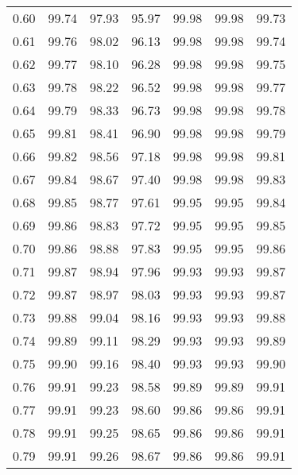 \begin{tabular}{|c|c|c|c|c|c|c|}
      0.60 &     99.74 &     97.93 &      95.97 &   99.98 &      99.98 &         99.73 \\
      0.61 &     99.76 &     98.02 &      96.13 &   99.98 &      99.98 &         99.74 \\
      0.62 &     99.77 &     98.10 &      96.28 &   99.98 &      99.98 &         99.75 \\
      0.63 &     99.78 &     98.22 &      96.52 &   99.98 &      99.98 &         99.77 \\
      0.64 &     99.79 &     98.33 &      96.73 &   99.98 &      99.98 &         99.78 \\
      0.65 &     99.81 &     98.41 &      96.90 &   99.98 &      99.98 &         99.79 \\
      0.66 &     99.82 &     98.56 &      97.18 &   99.98 &      99.98 &         99.81 \\
      0.67 &     99.84 &     98.67 &      97.40 &   99.98 &      99.98 &         99.83 \\
      0.68 &     99.85 &     98.77 &      97.61 &   99.95 &      99.95 &         99.84 \\
      0.69 &     99.86 &     98.83 &      97.72 &   99.95 &      99.95 &         99.85 \\
      0.70 &     99.86 &     98.88 &      97.83 &   99.95 &      99.95 &         99.86 \\
      0.71 &     99.87 &     98.94 &      97.96 &   99.93 &      99.93 &         99.87 \\
      0.72 &     99.87 &     98.97 &      98.03 &   99.93 &      99.93 &         99.87 \\
      0.73 &     99.88 &     99.04 &      98.16 &   99.93 &      99.93 &         99.88 \\
      0.74 &     99.89 &     99.11 &      98.29 &   99.93 &      99.93 &         99.89 \\
      0.75 &     99.90 &     99.16 &      98.40 &   99.93 &      99.93 &         99.90 \\
      0.76 &     99.91 &     99.23 &      98.58 &   99.89 &      99.89 &         99.91 \\
      0.77 &     99.91 &     99.23 &      98.60 &   99.86 &      99.86 &         99.91 \\
      0.78 &     99.91 &     99.25 &      98.65 &   99.86 &      99.86 &         99.91 \\
      0.79 &     99.91 &     99.26 &      98.67 &   99.86 &      99.86 &         99.91 \\

\end{tabular}
